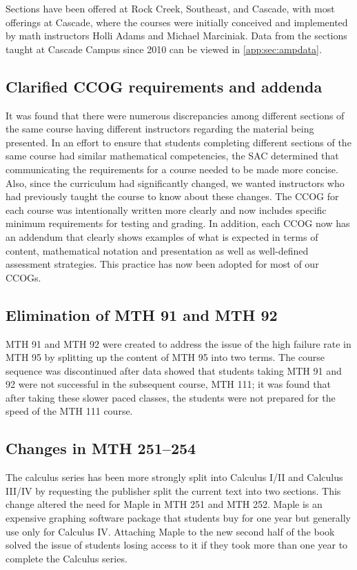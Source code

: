 Sections have been offered at Rock Creek, Southeast, and Cascade,
with most offerings at Cascade, where the courses were initially
conceived and implemented by math instructors Holli Adams and  Michael
Marciniak. Data from the sections taught at
Cascade Campus since 2010 can be viewed in \vref{app:sec:ampdata}.

\subsection{Clarified CCOG requirements and addenda}
It was found that there were numerous discrepancies among different sections of
the same course having different instructors regarding the material being
presented. In an effort to ensure that students completing different sections of
the same course had similar mathematical competencies, the SAC determined that
communicating the requirements for a course needed to be made more concise.
Also, since the curriculum had significantly changed, we wanted instructors who
had previously taught the course to know about these changes.  The CCOG for each
course was intentionally written more clearly and now includes specific minimum
requirements for testing and grading.  In addition, each CCOG now has an
addendum that clearly shows examples of what is expected in terms of content,
mathematical notation and presentation as well as well-defined assessment
strategies.  This practice has now been adopted for most of our CCOGs.

\subsection{Elimination of MTH 91 and MTH 92}
MTH 91 and MTH 92 were created to address the issue of the high failure rate in
MTH 95 by splitting up the content of MTH 95 into two terms.  The course
sequence was discontinued after data showed that students taking MTH 91 and 92
were not successful in the subsequent course, MTH 111; it was found that after
taking these slower paced classes, the students were not prepared for the speed
of the MTH 111 course.

\subsection{Changes in MTH 251--254}
The calculus series has been more strongly split into Calculus I/II and Calculus
III/IV by requesting the publisher split the current text into two sections.
This change altered the need for Maple in MTH 251 and MTH 252.  Maple is an
expensive graphing software package that students buy for one year but generally
use only for Calculus IV. Attaching Maple to the new second half of the book
solved the issue of students losing access to it if they took more than one year
to complete the Calculus series.

